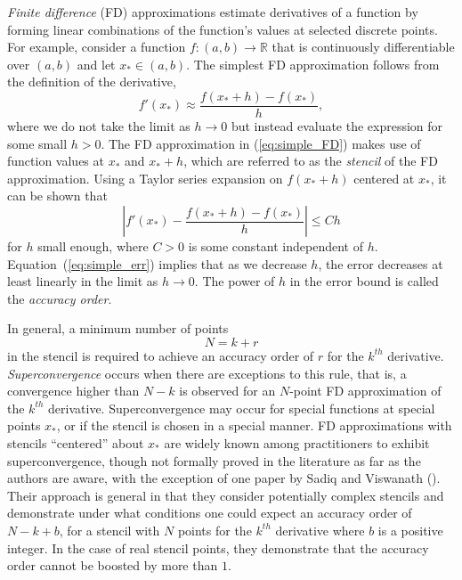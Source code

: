 \documentclass[12pt]{article}
\newcommand{\xstar}{x_*}
\begin{document}
\textit{Finite difference} (FD) approximations estimate derivatives of a function by forming linear combinations of the function's values at selected discrete points.
For example, consider a function $f:(a,b)\to \mathbb R$ that is continuously differentiable over $(a,b)$ and let $\xstar\in(a,b)$.
The simplest FD approximation follows from the definition of the derivative, 
\begin{equation}\label{eq:simple_FD}
	f'(\xstar) \approx \frac{f(\xstar+h)-f(\xstar)}{h},
\end{equation}
where we do not take the limit as $h\to 0$ but instead evaluate the expression for some small $h>0$.
The FD approximation in (\ref{eq:simple_FD}) makes use of function values at $\xstar$ and $\xstar+h$, which are referred to as the \textit{stencil} of the FD approximation. 
Using a Taylor series expansion on $f(\xstar+h)$ centered at $\xstar$, it can be shown that
\begin{equation}\label{eq:simple_err}
	\left|f'(\xstar) - \frac{f(\xstar+h)-f(\xstar)}{h} \right| \le Ch
\end{equation}
for $h$ small enough, where $C>0$ is some constant independent of $h$.
Equation~(\ref{eq:simple_err}) implies that as we decrease $h$, the error decreases at least linearly in the limit as $h\to 0$. 
The power of $h$ in the error bound is called the \textit{accuracy order}.

In general, a minimum number of points
\begin{equation}\label{eq:conv_rule}
	N=k+r
\end{equation}
in the stencil is required to achieve an accuracy order of $r$ for the $k^{th}$ derivative.
\textit{Superconvergence} occurs when there are exceptions to this rule, that is, a convergence higher than $N-k$ is observed for an $N$-point FD approximation of the $k^{th}$ derivative. 
Superconvergence may occur for special functions at special points $\xstar$, or if the stencil is chosen in a special manner.
FD approximations with stencils ``centered'' about $\xstar$ are widely known among practitioners to exhibit superconvergence, though not formally proved in the literature as far as the authors are aware, with the exception of one paper by Sadiq and Viswanath (\cite{sadiq2014}).
Their approach is general in that they consider potentially complex stencils and demonstrate under what conditions one could expect an accuracy order of $N-k+b$, for a stencil with $N$ points for the $k^{th}$ derivative where $b$ is a positive integer.
In the case of real stencil points, they demonstrate that the accuracy order cannot be boosted by more than $1$.
\end{document}
